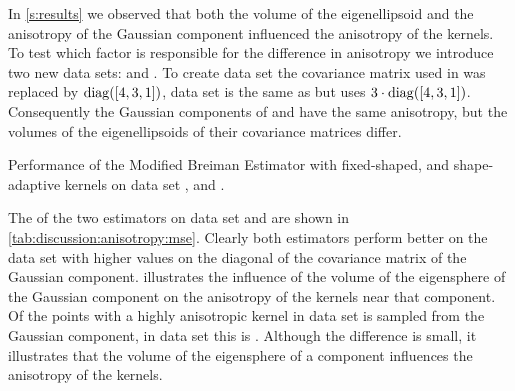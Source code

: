 	In \cref{s:results} we observed that both the volume of the eigenellipsoid and the anisotropy of the Gaussian component influenced the anisotropy of the kernels. To test which factor is responsible for the difference in anisotropy we introduce two new data sets: \anisotropyOne and \anisotropyTwo.
	To create data set \anisotropyOne the covariance matrix used in \ferdosiOne was replaced by $\operatorname{diag}([4, 3, 1])$, data set \anisotropyTwo is the same as \anisotropyOne but uses $3 \cdot \operatorname{diag}([4, 3, 1])$.
	Consequently the Gaussian components of \anisotropyOne and \anisotropyTwo have the same anisotropy, but the volumes of the eigenellipsoids of their covariance matrices differ.
	\begin{table}
		\centering
		
		\caption{Performance of the Modified Breiman Estimator with fixed-shaped, and shape-adaptive kernels on data set \anisotropyOne, and \anisotropyTwo.}
		\label{tab:discussion:anisotropy:mse}
	\end{table}
	The \mses of the two estimators on data set \anisotropyOne and \anisotropyTwo are shown in \cref{tab:discussion:anisotropy:mse}. Clearly both estimators perform better on the data set with higher values on the diagonal of the covariance matrix of the Gaussian component.
	 illustrates the influence of the volume of the eigensphere of the Gaussian component on the anisotropy of the kernels near that component. Of the points with a highly anisotropic kernel in data set \anisotropyOne {} is sampled from the Gaussian component, in data set \anisotropyTwo this is . Although the difference is small, it illustrates that the volume of the eigensphere of a component influences the anisotropy of the kernels.
